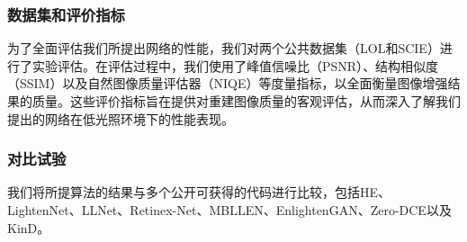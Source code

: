 \documentclass[a4paper]{ctexart}
\begin{document}
	\subsubsection{数据集和评价指标}
	
	为了全面评估我们所提出网络的性能，我们对两个公共数据集（LOL\cite{wei2018deep}和SCIE\cite{cai2018learning}）进行了实验评估。在评估过程中，我们使用了峰值信噪比（PSNR）\cite{wang2004image}、结构相似度（SSIM）\cite{wang2004image}以及自然图像质量评估器（NIQE）\cite{mittal2012making}等度量指标，以全面衡量图像增强结果的质量。这些评价指标旨在提供对重建图像质量的客观评估，从而深入了解我们提出的网络在低光照环境下的性能表现。
	
	\subsubsection{对比试验}
	
	我们将所提算法的结果与多个公开可获得的代码进行比较，包括HE\cite{pisano1998contrast}、LightenNet\cite{li2018lightennet}、LLNet\cite{lore2017llnet}、Retinex-Net\cite{wei2018deep}、MBLLEN\cite{lv2018mbllen}、EnlightenGAN\cite{jiang2021enlightengan}、Zero-DCE\cite{guo2020zero}以及KinD\cite{zhang2019kindling}。
	
\end{document}
